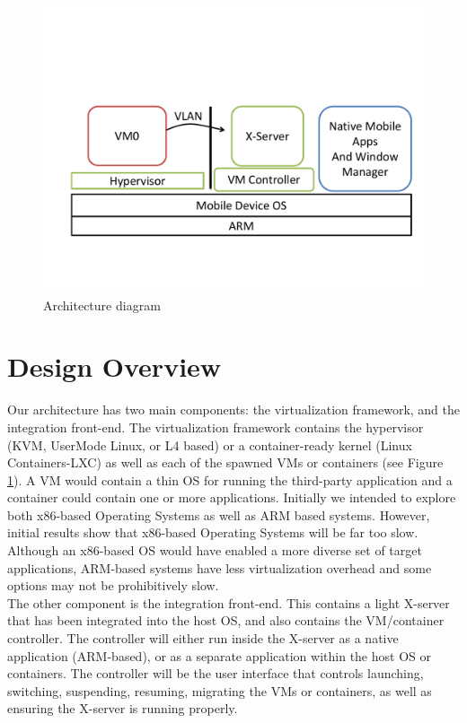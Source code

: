\begin{figure}[bth]
\centering
\includegraphics[width=1.5\columnwidth]{arch}
\caption{Architecture diagram}
\label{fig:arch}
\end{figure}

\section{Design Overview}
\label{sec:overview}

\label{sec:proposedarch}
Our architecture has two main components: the virtualization framework, and the integration front-end.  The virtualization framework contains the hypervisor (KVM, UserMode Linux, or L4 based) or a container-ready kernel (Linux Containers-LXC) as well as each of the spawned VMs or containers (see Figure \ref{fig:arch}).  A VM would contain a thin OS for running the third-party application and a container could contain one or more applications.  Initially we intended to explore both x86-based Operating Systems as well as ARM based systems.  However, initial results show that x86-based Operating Systems will be far too slow.  Although an x86-based OS would have enabled a more diverse set of target applications, ARM-based systems have less virtualization overhead and some options may not be prohibitively slow. \\

The other component is the integration front-end. This contains a light X-server that has been integrated into the host OS, and also contains the VM/container controller. The controller will either run inside the X-server as a native application (ARM-based), or as a separate application within the host OS or containers. The controller will be the user interface that controls launching, switching, suspending, resuming, migrating the VMs or containers, as well as ensuring the X-server is running properly. %

